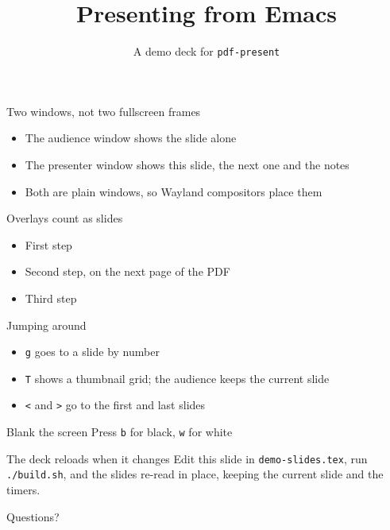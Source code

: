 \documentclass[aspectratio=169]{beamer}
\title{Presenting from Emacs}
\subtitle{A demo deck for \texttt{pdf-present}}
\date{}
\begin{document}
\begin{frame}
  \titlepage
\end{frame}

\begin{frame}{Two windows, not two fullscreen frames}
  \begin{itemize}
  \item The audience window shows the slide alone
  \item The presenter window shows this slide, the next one and the notes
  \item Both are plain windows, so Wayland compositors place them
  \end{itemize}
\end{frame}

\begin{frame}{Overlays count as slides}
  \begin{itemize}
  \item<1-> First step
  \item<2-> Second step, on the next page of the PDF
  \item<3-> Third step
  \end{itemize}
\end{frame}

\begin{frame}{Jumping around}
  \begin{itemize}
  \item \texttt{g} goes to a slide by number
  \item \texttt{T} shows a thumbnail grid; the audience keeps the current slide
  \item \texttt{<} and \texttt{>} go to the first and last slides
  \end{itemize}
\end{frame}

\begin{frame}{Blank the screen}
  \centering\Large Press \texttt{b} for black, \texttt{w} for white
\end{frame}

\begin{frame}{The deck reloads when it changes}
  Edit this slide in \texttt{demo-slides.tex}, run \texttt{./build.sh}, and the slides re-read in place, keeping the current slide and the timers.
\end{frame}

\begin{frame}
  \centering\Huge Questions?
\end{frame}
\end{document}
